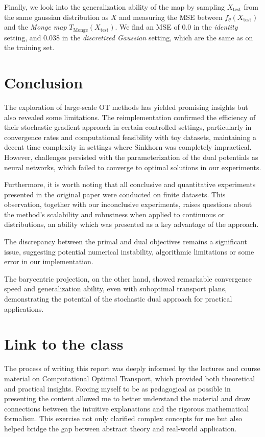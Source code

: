 \documentclass[a4paper,11pt]{article}
\newcommand{\1}{\mathbbm{1}}
\begin{document}
Finally, we look into the generalization ability of the map by sampling $X_{\text{test}}$ from the same gaussian distribution as $X$ and measuring the MSE between $f_{\theta}(X_{\text{test}})$ and the \emph{Monge map} $T_{\text{Monge}}(X_{\text{test}})$. We find an MSE of $0.0$ in the \emph{identity} setting, and $0.038$ in the \emph{discretized Gaussian} setting, which are the same as on the training set.

\section{Conclusion}
\label{sec:conclusion}

The exploration of \citet{seguy2018largescaleoptimaltransportmapping} large-scale OT methods has yielded promising insights but also revealed some limitations. The reimplementation confirmed the efficiency of their stochastic gradient approach in certain controlled settings, particularly in convergence rates and computational feasibility with toy datasets, maintaining a decent time complexity in settings where Sinkhorn was completely impractical. However, challenges persisted with the parameterization of the dual potentials as neural networks, which failed to converge to optimal solutions in our experiments.

Furthermore, it is worth noting that all conclusive and quantitative experiments presented in the original paper were conducted on finite datasets. This observation, together with our inconclusive experiments, raises questions about the method’s scalability and robustness when applied to continuous or distributions, an ability which was presented as a key advantage of the approach.

The discrepancy between the primal and dual objectives remains a significant issue, suggesting potential numerical instability, algorithmic limitations or some error in our implementation.

The barycentric projection, on the other hand, showed remarkable convergence speed and generalization ability, even with suboptimal transport plans, demonstrating the potential of the stochastic dual approach for practical applications.

\section{Link to the class}
\label{sec:link_to_the_class}

The process of writing this report was deeply informed by the lectures and course material on Computational Optimal Transport, which provided both theoretical and practical insights. Forcing myself to be as pedagogical as possible in presenting the content allowed me to better understand the material and draw connections between the intuitive explanations and the rigorous mathematical formalism. This exercise not only clarified complex concepts for me but also helped bridge the gap between abstract theory and real-world application.
\end{document}
